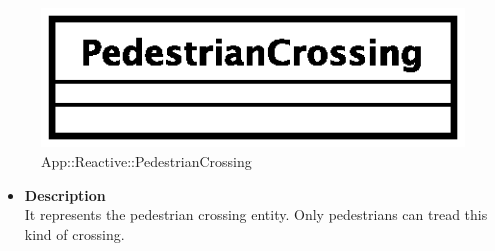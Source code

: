 \begin{figure}[h]
\centering
\includegraphics[scale=0.6,keepaspectratio]{images/solution/pedestrian_crossing.eps}
\caption{App::Reactive::PedestrianCrossing}
\label{fig:sd-app-pedestrian_crossing}
\end{figure}
\FloatBarrier
\begin{itemize}
  \item \textbf{Description} \\
    It represents the pedestrian crossing entity. Only pedestrians can tread this kind 
of crossing. 
\end{itemize}

